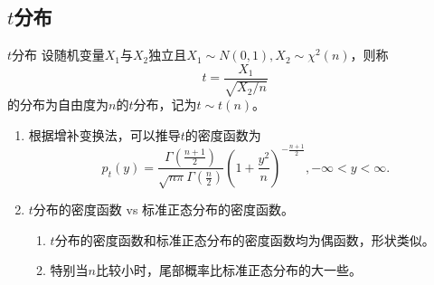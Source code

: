 \subsection{$t$分布}
\begin{definition}{$t$分布}
    设随机变量$X_1$与$X_2$独立且$X_1\sim N(0,1),X_2\sim \chi^2(n)$，则称$$t=\frac{X_{1}}{\sqrt{X_{2}/n } } $$的分布为自由度为$n$的$t$分布，记为$t\sim t(n)$。
\end{definition}
\begin{remark}
    \begin{enumerate}
        \item 根据增补变换法，可以推导$t$的密度函数为
        $$
        p_t(y) = \frac{\Gamma\left(\frac{n+1}{2} \right)}{\sqrt{n\pi}\Gamma\left(\frac{n}{2}\right)} \left(1 + \frac{y^2}{n}\right)^{-\frac{n+1}{2}}, -\infty < y < \infty.
        $$
        \item $t$分布的密度函数 vs 标准正态分布的密度函数。
        \begin{enumerate}
            \item  $t$分布的密度函数和标准正态分布的密度函数均为偶函数，形状类似。
            \item 特别当$n$比较小时，尾部概率比标准正态分布的大一些。
        \end{enumerate}
    \end{enumerate}
\end{remark}


